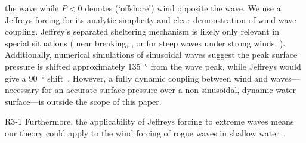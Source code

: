 \documentclass{jfm}
\begin{document}
the wave while $P<0$ denotes (`offshore') wind opposite the wave. We use
a Jeffreys forcing for its analytic simplicity and clear demonstration
of wind-wave coupling.
Jeffrey's separated sheltering mechanism is likely only relevant
in special situations (\eg{} near breaking,
\citealp{banner1976separation}, or for steep waves under strong winds,
\citealp{tian2013evolution,touboul2006interaction}).
Additionally, numerical simulations of sinusoidal waves suggest the peak
surface pressure is shifted approximately \SI{135}{\degree} from the
wave peak, while Jeffreys would give a \SI{90}{\degree}
shift~\citep{husain2019boundary}.
However, a fully dynamic coupling between wind and waves---necessary for
an accurate surface pressure over a non-sinusoidal, dynamic water
surface---is outside the scope of this paper.
\begin{LineLabel}{R3-1}
Furthermore, the applicability of Jeffreys forcing to extreme waves
means our theory could apply to the wind forcing of rogue waves in
shallow water~\citep{kharif2008influence}.
\end{LineLabel}
\end{document}
